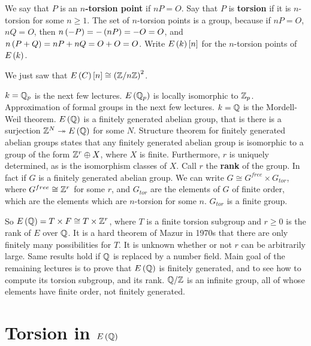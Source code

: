 \begin{definition}
We say that $ P $ is an \textbf{$ n $-torsion point} if $ nP = O $. Say that $ P $ is \textbf{torsion} if it is $ n $-torsion for some $ n \ge 1 $. The set of $ n $-torsion points is a group, because if $ nP = O $, $ nQ = O $, then $ n\left( -P \right) = -\left( nP \right) = -O = O $, and $ n\left( P + Q \right) = nP + nQ = O + O = O $. Write $ E\left( k \right)\left[ n \right] $ for the $ n $-torsion points of $ E\left( k \right) $.
\end{definition}

\begin{example*}
We just saw that $ E\left( C \right)\left[ n \right] \cong \left( \mathbb{Z} / n\mathbb{Z} \right)^2 $.
\end{example*}

$ k = \mathbb{Q}_p $ is the next few lectures. $ E\left( \mathbb{Q}_p \right) $ is locally isomorphic to $ \mathbb{Z}_p $. Approximation of formal groups in the next few lectures. $ k = \mathbb{Q} $ is the Mordell-Weil theorem. $ E\left( \mathbb{Q} \right) $ is a finitely generated abelian group, that is there is a surjection $ \mathbb{Z}^N \twoheadrightarrow E\left( \mathbb{Q} \right) $ for some $ N $. Structure theorem for finitely generated abelian groups states that any finitely generated abelian group is isomorphic to a group of the form $ \mathbb{Z}^r \oplus X $, where $ X $ is finite. Furthermore, $ r $ is uniquely determined, as is the isomorphism classes of $ X $. Call $ r $ the \textbf{rank} of the group. In fact if $ G $ is a finitely generated abelian group. We can write $ G \cong G^{free} \times G_{tor} $, where $ G^{free} \cong \mathbb{Z}^r $ for some $ r $, and $ G_{tor} $ are the elements of $ G $ of finite order, which are the elements which are $ n $-torsion for some $ n $. $ G_{tor} $ is a finite group.


So $ E\left( \mathbb{Q} \right) = T \times F \cong T \times \mathbb{Z}^r $, where $ T $ is a finite torsion subgroup and $ r \ge 0 $ is the rank of $ E $ over $ \mathbb{Q} $. It is a hard theorem of Mazur in 1970s that there are only finitely many possibilities for $ T $. It is unknown whether or not $ r $ can be arbitrarily large. Same results hold if $ \mathbb{Q} $ is replaced by a number field. Main goal of the remaining lectures is to prove that $ E\left( \mathbb{Q} \right) $ is finitely generated, and to see how to compute its torsion subgroup, and its rank. $ \mathbb{Q} / \mathbb{Z} $ is an infinite group, all of whose elements have finite order, not finitely generated.

\pagebreak

\section{Torsion in $ E\left( \mathbb{Q} \right) $}

